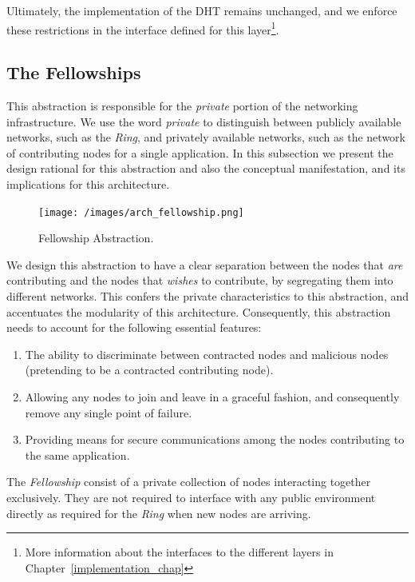 \documentclass[12pt, titlepage]{uo_temp}
\begin{document}
     Ultimately, the implementation of the DHT remains unchanged, and we enforce these
     restrictions in the interface defined for this layer\footnote{More information
       about the interfaces to the different layers in Chapter~\ref{implementation_chap}}.

     \subsection{The Fellowships}
     This abstraction is responsible for the \emph{private} portion of the networking
     infrastructure. We use the word \emph{private} to distinguish between publicly
     available networks, such as the \emph{Ring}, and privately available networks, such
     as the network of contributing nodes for a single application. In this subsection we
     present the design rational for this abstraction and also the conceptual
     manifestation, and its implications for this architecture. 

     \begin{figure}
       \texttt{[image: /images/arch\_fellowship.png]}
       \caption{Fellowship Abstraction.}
     \end{figure}

     We design this abstraction to have a clear separation between the nodes that
     \emph{are} contributing and the nodes that \emph{wishes} to contribute, by
     segregating them into different networks. This confers the private characteristics to
     this abstraction, and accentuates the modularity of this architecture. Consequently,
     this abstraction needs to account for the following essential features:

     \begin{enumerate}
       \item The ability to discriminate between contracted nodes and malicious nodes
         (pretending to be a contracted contributing node).
       \item Allowing any nodes to join and leave in a graceful fashion, and consequently
         remove any single point of failure.
       \item Providing means for secure communications among the nodes contributing to the
         same application. 
     \end{enumerate}

     The \emph{Fellowship} consist of a private collection of nodes interacting together
     exclusively. They are not required to interface with any public environment directly
     as required for the \emph{Ring} when new nodes are arriving.
\end{document}
